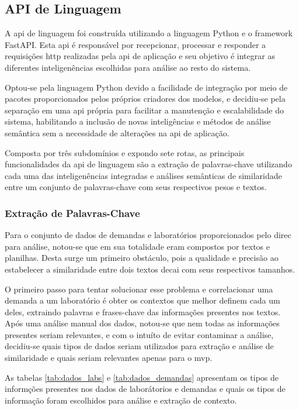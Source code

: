 \subsection{API de Linguagem}\label{subsec:language_api}

A \gls{api} de linguagem foi construída utilizando a linguagem Python e o framework FastAPI. Esta \gls{api} é responsável por recepcionar, processar e responder a requisições \gls{http} realizadas pela \gls{api} de aplicação e seu objetivo é integrar as diferentes inteligenências escolhidas para análise ao resto do sistema.

Optou-se pela linguagem Python devido a facilidade de integração por meio de pacotes proporcionados pelos próprios criadores dos modelos, e decidiu-se pela separação em uma \gls{api} própria para facilitar a manutenção e escalabilidade do sistema, habilitando a inclusão de novas inteligências e métodos de análise semântica sem a necessidade de alterações na \gls{api} de aplicação.

Composta por três subdomínios e expondo sete rotas, as principais funcionalidades da \gls{api} de linguagem são a extração de palavras-chave utilizando cada uma das inteligenências integradas e análises semânticas de similaridade entre um conjunto de palavras-chave com seus respectivos pesos e textos.

\subsubsection{Extração de Palavras-Chave}\label{subsubsec:keyword_extraction}

Para o conjunto de dados de demandas e laboratórios proporcionados pelo \gls{direc} para análise, notou-se que em sua totalidade eram compostos por textos e planilhas. Desta surge um primeiro obstáculo, pois a qualidade e precisão ao estabelecer a similaridade entre dois textos decai com seus respectivos tamanhos.

O primeiro passo para tentar solucionar esse problema e correlacionar uma demanda a um laboratório é obter os contextos que melhor definem cada um deles, extraindo palavras e frases-chave das informações presentes nos textos. Após uma análise manual dos dados, notou-se que nem todas as informações presentes seriam relevantes, e com o intuíto de evitar contaminar a análise, decidiu-se quais tipos de dados seriam utilizados para extração e análise de similaridade e quais seriam relevantes apenas para o \gls{mvp}.

As tabelas \autoref{tab:dados_labs} e \autoref{tab:dados_demandas} apresentam os tipos de informções presentes nos dados de laborátorios e demandas e quais os tipos de informação foram escolhidos para análise e extração de contexto.

